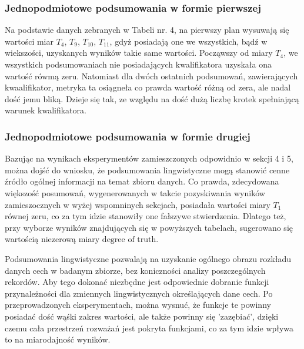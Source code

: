 \documentclass{classrep}
\begin{document}
\subsubsection{Jednopodmiotowe podsumowania w formie pierwszej}

Na podstawie danych zebranych w Tabeli nr. 4, na pierwszy plan wysuwają się wartości miar $T_4$, $T_9$, $T_{10}$, $T_{11}$, gdyż posiadają one we wszystkich, bądź w wiekszości, uzyskanych wyników takie same wartości. 
Począwszy od miary $T_4$, we wszystkich podsumowaniach nie posiadających kwalifikatora uzyskała ona wartość rówmą zeru. Natomiast dla dwóch ostatnich podsumowań, zawierających kwaalifikator, metryka ta osiągneła co prawda wartość różną od zera, ale nadal dość jemu bliką. Dzieje się tak, ze względu na dość dużą liczbę krotek spełniającą warunek kwalifikatora.


\subsubsection{Jednopodmiotowe podsumowania w formie drugiej}



Bazując na wynikach eksperymentów zamieszczonych odpowidnio w sekcji 4 i 5, można dojść do wniosku, że podsumowania lingwistyczne
mogą stanowić cenne źródło ogólnej informacji na temat zbioru danych. Co prawda, zdecydowana większość posumowań, wygenerowanych w takcie pozyskiwania wyników zamieszocznych w wyżej 
wspomninych sekcjach, posiadała wartości miary \(T_1\) równej zeru, co za tym idzie stanowiły one fałszywe stwierdzenia. Dlatego też, przy wyborze wyników znajdujących się w powyższych tabelach, sugerowano się 
wartością niezerową miary \(\text{degree of truth}\).

Podsumowania lingwistyczne pozwalają na uzyskanie ogólnego obrazu rozkładu danych cech w badanym zbiorze, bez koniczności analizy poszczególnych rekordów. Aby tego dokonać niezbędne jest odpowiednie dobranie funkcji przynależności
dla zmiennych lingwistycznych określających dane cech. Po przeprowadzonych eksperymentach, można wysnuć, że funkcje te powinny posiadać dość wąśki zakres wartości, ale także powinny się 'zazębiać', dzięki czemu cała przestrzeń rozważań jest pokryta funkcjami, co za tym idzie wpływa to na 
miarodajność wyników.
\end{document}
